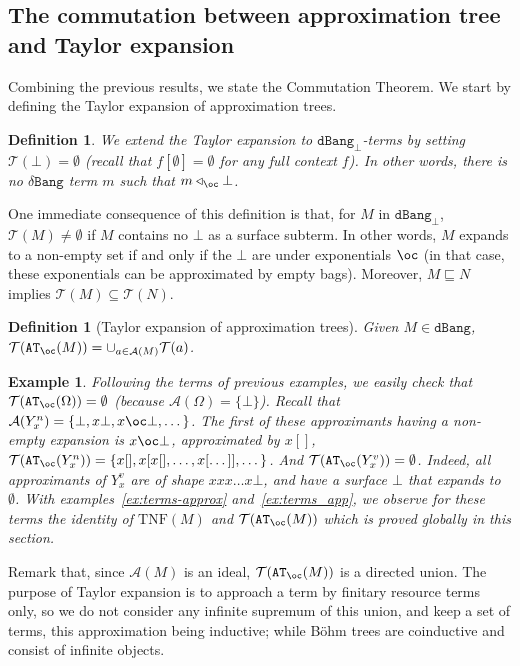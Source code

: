 \documentclass[10pt,a4paper]{article}
\newtheorem{definition}[theorem]{Definition}
\newtheorem{example}[theorem]{Example}
\newcommand{\<}{\langle}
\renewcommand{\>}{\rangle}
\newcommand{\dbang}{\ensuremath{\mathtt{dBang}}}
\newcommand{\dbangb}{\ensuremath{\dbang_\bot}}
\newcommand{\dbangres}{\ensuremath{\mathtt{\delta Bang}}}
\newcommand{\app}{\triangleleft_\oc} %
\newcommand{\mcal}[1]{\ensuremath{\mathcal{#1}}}
\newcommand{\setApprox}{\mcal{A}}
\newcommand{\setapprox}{\setApprox}
\newcommand{\taylor}[1]{\ensuremath{\mathcal{T}(#1)}}
\newcommand{\taylornf}[1]{\ensuremath{\text{TNF}(#1)}}
\newcommand{\btb}{\ensuremath{{\tt{AT}_\oc}}}
\newcommand{\smaller}{\ensuremath{\sqsubseteq}}
\begin{document}
\subsection{The commutation between approximation tree and Taylor expansion}
\label{subsec:bang:commutation}
Combining the previous results, we state the Commutation Theorem. We start by defining the Taylor expansion of approximation trees.

\begin{definition}\label{def:taylor-dbangb}
We extend the Taylor expansion to $\dbangb$-terms by setting
	$\taylor \bot=\emptyset$ (recall that $f[\emptyset]=\emptyset$ for any
	full context $f$). In other words, there is no $\dbangres$ term $m$ such
	that $m\app \bot$.
\end{definition}

One immediate consequence of this definition is that, for $M$ in $\dbangb$, $\taylor
M\neq\emptyset$ if $M$ contains no $\bot$ as a surface subterm. In other words, $M$
expands to a non-empty set if and only if the $\bot$ are under exponentials
$\oc$ (in that case, these exponentials can be approximated by empty bags).
Moreover, $M\smaller N$ implies $\taylor M\subseteq \taylor N$.


\begin{definition}[Taylor expansion of approximation trees]\label{def:taylor_bohm}
	Given $M\in \dbang$, $\taylor{\btb(M)}=\cup_{a\in\setapprox(M)}\taylor a$.
\end{definition}

\begin{example}\label{ex:bt-taylor}
	Following the terms of previous examples, we easily check that
	$\taylor{\btb(\Omega)}=\emptyset$ (because
	$\setapprox{(\Omega)}=\{\bot\}$).
	Recall that $\setapprox{(Y^n_x)}=\{\bot,x\bot,x\oc\bot,\dots \}$. The first of
	these approximants having a non-empty expansion is $x\oc\bot$,
	approximated by $x[]$, 
	$\taylor{\btb(Y^n_x)}=\{x[],x[x[],\dots ,x[\dots ]],\dots \}$.
	And
	$\taylor{\btb(Y^v_x)}=\emptyset$. Indeed, all approximants of $Y^v_x$ are
	of shape $xxx\dots x\bot$, and have a surface $\bot$ that expands to
	$\emptyset$.
	With examples~\ref{ex:terms-approx}
	and~\ref{ex:terms_app}, we observe for these terms the identity of $\taylornf{M}$ and
	$\taylor{\btb(M)}$ which is proved globally in this section.
\end{example}
Remark that, since $\setapprox(M)$ is an ideal, $\taylor{\btb (M)}$ is a directed
union. The purpose of Taylor expansion is to approach a term by finitary resource
terms only, so we do not consider any infinite supremum of this union, and keep
a set of terms, this approximation being inductive; while Böhm trees are
coinductive and consist of infinite objects.
\end{document}
